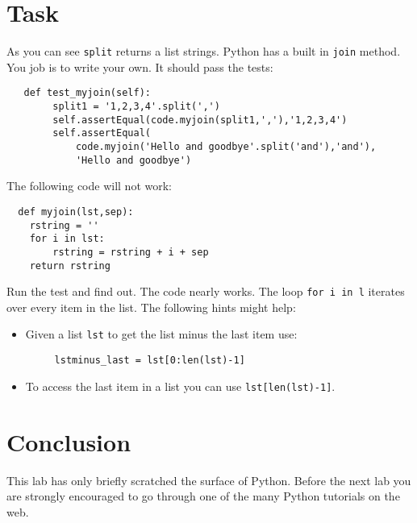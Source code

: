 \documentclass{paper}
\begin{document}
\section{Task}
As you can see {\tt split} returns a list strings. Python has a built
in {\tt join} method. You job is to write your own. It should pass the
tests:
\begin{lstlisting}
   def test_myjoin(self):
        split1 = '1,2,3,4'.split(',')
        self.assertEqual(code.myjoin(split1,','),'1,2,3,4')
        self.assertEqual(
            code.myjoin('Hello and goodbye'.split('and'),'and'),
            'Hello and goodbye')
\end{lstlisting}

The following code will not work:
\begin{lstlisting}
  def myjoin(lst,sep):
    rstring = '' 
    for i in lst:
        rstring = rstring + i + sep
    return rstring
\end{lstlisting}
Run the test and find out. The code nearly works. The loop {\tt for i in l}
iterates over every item in the list. The following hints might help:
\begin{itemize}
\item Given a list {\tt lst} to get the list minus the last item use:
  \begin{lstlisting}
     lstminus_last = lst[0:len(lst)-1]
  \end{lstlisting}
\item To access the last item in a list you can use {\tt lst[len(lst)-1]}.
\end{itemize}


\section*{Conclusion}
This lab has only briefly scratched the surface of Python. Before the next lab
you are strongly encouraged to go through one of the many Python tutorials on
the web.
\end{document}
